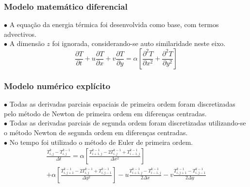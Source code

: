 \documentclass[xcolor=dvipsnames,10pt,aspectratio=169]{beamer}
\begin{document}
	
	\begin{frame} 
	\frametitle{Modelo matemático diferencial}
		$\bullet$ A equação da energia térmica foi desenvolvida como base, com termos advectivos.\\
		$\bullet$ A dimensão $z$ foi ignorada, considerando-se auto similaridade neste eixo.\\
		
	
	\begin{equation}
	\frac{\partial T}{\partial t} + u \frac{\partial T}{\partial x} + v \frac{\partial T}{\partial y} = \alpha \left[  \frac{\partial^2 T}{\partial x^2} + \frac{\partial^2 T}{\partial y^2}   \right] 
	\end{equation}
	
	\end{frame}





	\begin{frame} 
	\frametitle{Modelo numérico explícito}
	$\bullet$ Todas as derivadas parciais espaciais de primeira ordem foram discretizadas pelo método de Newton de primeira ordem em diferenças centradas.\\
	$\bullet$ Todas as derivadas parciais de segunda ordem foram discretizadas utilizando-se o método Newton de segunda ordem em diferenças centradas.\\
	$\bullet$ No tempo foi utilizado o método de Euler de primeira ordem.\\
	
	
	\begin{equation}
	\begin{split}
	\frac{T_{i,j}^{k} - T_{i , j}^{k-1} }{\Delta t}
	= \alpha \left[  \frac{T_{i+1,j}^{k-1} - 2 T_{i,j}^{k-1} + T_{i-1,j}^{k-1} }{\Delta x^2} \right]\\
	+\alpha \left[\frac{T_{i,j+1}^{k-1} - 2 T_{i,j}^{k-1} + T_{i,j-1}^{k-1}}{\Delta y^2}\right] - u \frac{T_{i+1,j}^{k-1} - T_{i-1,j}^{k-1}}{2 \Delta x} - v \frac{T_{i,j+1}^{k-1} - T_{i , j-1}^{k-1}}{2 \Delta y}  
	\end{split}
	\end{equation}
	
	\end{frame}
\end{document}
